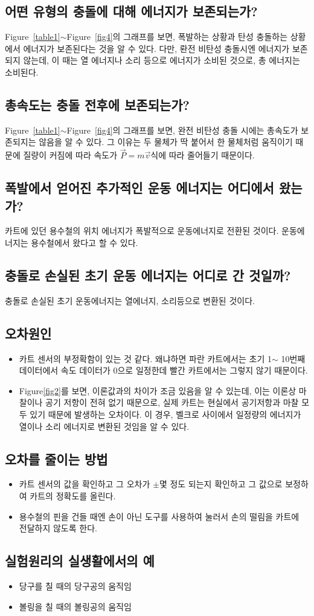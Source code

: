 \documentclass[12pt,a4paper]{article}
\begin{document}
\subsection{어떤 유형의 충돌에 대해 에너지가 보존되는가?}
Figure~\ref{table1}$\sim$Figure~\ref{fig4}의 그래프를 보면, 폭발하는 상황과 탄성
충돌하는 상황에서 에너지가 보존된다는 것을 알 수 있다. 다만, 롼전 비탄성 충돌시엔
에너지가 보존되지 않는데, 이 때는 열 에너지나 소리 등으로 에너지가 소비된 것으로, 총
에너지는 소비된다.
\subsection{총속도는 충돌 전후에 보존되는가?}
Figure~\ref{table1}$\sim$Figure~\ref{fig4}의 그래프를 보면, 완전 비탄성 충돌
시에는 총속도가 보존되지는 않음을 알 수 있다. 그 이유는 두 물체가 딱 붙어서 한
물체처럼 움직이기 때문에 질량이 커짐에 따라 속도가 $\vec{P}=m\vec{v}$식에 따라
줄어들기 때문이다.
\subsection{폭발에서 얻어진 추가적인 운동 에너지는 어디에서 왔는가?}
카트에 있던 용수철의 위치 에너지가 폭발적으로 운동에너지로 전환된 것이다. 운동에너지는
용수철에서 왔다고 할 수 있다.
\subsection{충돌로 손실된 초기 운동 에너지는 어디로 간 것일까?}
충돌로 손실된 초기 운동에너지는 열에너지, 소리등으로 변환된 것이다.
\subsection{오차원인}
\begin{itemize}
    \item 카트 센서의 부정확함이 있는 것 같다. 왜냐하면 파란 카트에서는 초기 1$\sim$
        10번째 데이터에서 속도 데이터가 0으로 일정한데 빨간 카트에서는 그렇지 않기
        때문이다.
    \item Figure\ref{fig2}를 보면, 이론값과의 차이가 조금 있음을 알 수 있는데,
        이는 이론상 마찰이나 공기 저항이 전혀 없기 때문으로, 실제 카트는 현실에서
        공기저항과 마찰 모두 있기 때문에 발생하는 오차이다. 이 경우, 벨크로 사이에서
        일정량의 에너지가 열이나 소리 에너지로 변환된 것임을 알 수 있다.
\end{itemize}
\subsection{오차를 줄이는 방법}
\begin{itemize}
    \item 카트 센서의 값을 확인하고 그 오차가 $\pm$몇 정도 되는지 확인하고
        그 값으로 보정하여 카트의 정확도를 올린다.
    \item 용수철의 핀을 건들 때엔 손이 아닌 도구를 사용하여 눌러서 손의 떨림을 카트에
        전달하지 않도록 한다.
\end{itemize}
\subsection{실험원리의 실생활에서의 예}
\begin{itemize}
    \item 당구를 칠 때의 당구공의 움직임
    \item 볼링을 칠 때의 볼링공의 움직임
\end{itemize}
\end{document}
